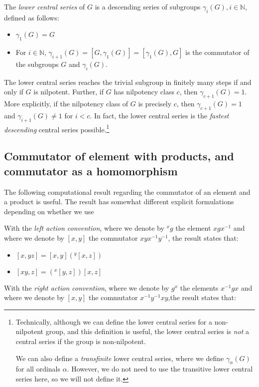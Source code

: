 \documentclass{ucetd}
\begin{document}
The {\em lower central series} of $G$ is a descending series of
subgroups $\gamma_i(G), i \in \mathbb{N}$, defined as follows:

\begin{itemize}
\item $\gamma_1(G) = G$
\item For $i \in \mathbb{N}$, $\gamma_{i+1}(G) = [G,\gamma_1(G)] =
  [\gamma_1(G),G]$ is the commutator of the subgroups $G$ and
  $\gamma_i(G)$.
\end{itemize}

The lower central series reaches the trivial subgroup in finitely many
steps if and only if $G$ is nilpotent. Further, if $G$ has nilpotency
class $c$, then $\gamma_{c+1}(G) = 1$. More explicitly, if the
nilpotency class of $G$ is precisely $c$, then $\gamma_{c+1}(G) = 1$
and $\gamma_{i+1}(G) \ne 1$ for $i < c$. In fact, the lower central
series is the {\em fastest descending} central series
possible.\footnote{Technically, although we can define the lower
  central series for a non-nilpotent group, and this definition is
  useful, the lower central series is {\em not} a central series if
  the group is non-nilpotent.

We can also define a {\em transfinite} lower central series, where we
define $\gamma_\alpha(G)$ for all ordinals $\alpha$. However, we do
not need to use the transitive lower central series here, so we will
not define it.}

\subsection{Commutator of element with products, and commutator as a homomorphism}

The following computational result regarding the commutator of an
element and a product is useful. The result has somewhat different explicit formulations depending on whether we use 

With the {\em left action convention}, where we denote by ${}^xg$ the
element $xgx^{-1}$ and where we denote by $[x,y]$ the commutator
$xyx^{-1}y^{-1}$, the result states that:

\begin{itemize}
\item $[x,yz] = [x,y](^y[x,z])$
\item $[xy,z] = ({}^x[y,z])[x,z]$
\end{itemize}

With the {\em right action convention}, where we denote by $g^x$ the
elements $x^{-1}gx$ and where we denote by $[x,y]$ the commutator
$x^{-1}y^{-1}xy$,the result states that:
\end{document}
